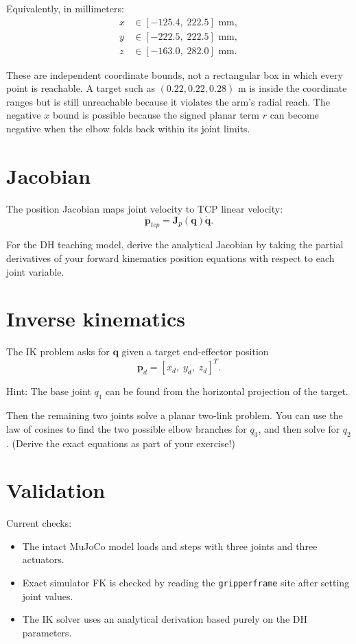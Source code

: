 \documentclass[11pt]{article}
\newcommand{\p}{\mathbf{p}}
\newcommand{\q}{\mathbf{q}}
\newcommand{\J}{\mathbf{J}}
\begin{document}
Equivalently, in millimeters:
\[
\begin{aligned}
x &\in [-125.4,\;222.5]\text{ mm},\\
y &\in [-222.5,\;222.5]\text{ mm},\\
z &\in [-163.0,\;282.0]\text{ mm}.
\end{aligned}
\]

These are independent coordinate bounds, not a rectangular box in which every
point is reachable. A target such as \((0.22,0.22,0.28)\) m is inside the
coordinate ranges but is still unreachable because it violates the arm's radial
reach. The negative \(x\) bound is possible because the signed planar term
\(r\) can become negative when the elbow folds back within its joint limits.

\section{Jacobian}
The position Jacobian maps joint velocity to TCP linear velocity:
\[
\dot{\p}_{tcp} = \J_p(\q)\dot{\q}.
\]

For the DH teaching model, derive the analytical Jacobian by taking the partial derivatives of your forward kinematics position equations with respect to each joint variable.

\section{Inverse kinematics}
The IK problem asks for \(\q\) given a target end-effector position
\[
\p_d = [x_d,\;y_d,\;z_d]^T.
\]

Hint: The base joint \(q_1\) can be found from the horizontal projection of the target.

Then the remaining two joints solve a planar two-link problem. You can use the law of cosines to find the two possible elbow branches for \(q_3\), and then solve for \(q_2\). (Derive the exact equations as part of your exercise!)

\section{Validation}
Current checks:
\begin{itemize}[leftmargin=1.3em]
  \item The intact MuJoCo model loads and steps with three joints and three actuators.
  \item Exact simulator FK is checked by reading the \texttt{gripperframe} site after setting joint values.
  \item The IK solver uses an analytical derivation based purely on the DH parameters.
\end{itemize}
\end{document}
